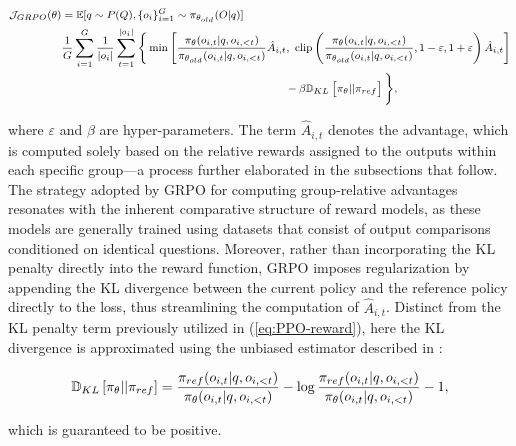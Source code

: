 \begin{itemize}[topsep=0pt]
\begin{itemize}[topsep=0pt]
\begin{equation}
\footnotesize
\begin{split}
    \mathcal{J}_{GRPO}(\theta) &= \mathbb{E}{[q \sim P(Q), \{o_i\}_{i=1}^G \sim \pi_{\theta_{old}}(O|q)]}  \\
    & \frac{1}{G}\sum_{i=1}^G\frac{1}{|o_i|} \sum_{t=1}^{|o_i|} \Bigg\{ \min \left[ \frac{\pi_\theta(o_{i,t} | q, o_{i,<t})}{\pi_{\theta_{old}}(o_{i,t} | q, o_{i,<t})} \hat{A}_{i,t},\ \text{clip} \left( \frac{\pi_\theta(o_{i,t} | q, o_{i,<t})}{\pi_{\theta_{old}}(o_{i,t} | q, o_{i,<t})}, 1 - \varepsilon, 1 + \varepsilon \right)  \hat{A}_{i,t} \right] \\
    & \hspace{6cm} - \beta \mathbb{D}_{KL}\left[\pi_{\theta} || \pi_{ref}\right]\Bigg\} ,
\end{split}
\label{eq:GRPO-obj}
\end{equation}

where $\varepsilon$ and $\beta$ are hyper-parameters. The term $\hat{A}_{i,t}$ denotes the advantage, which is computed solely based on the relative rewards assigned to the outputs within each specific group—a process further elaborated in the subsections that follow. The strategy adopted by GRPO for computing group-relative advantages resonates with the inherent comparative structure of reward models, as these models are generally trained using datasets that consist of output comparisons conditioned on identical questions. Moreover, rather than incorporating the KL penalty directly into the reward function, GRPO imposes regularization by appending the KL divergence between the current policy and the reference policy directly to the loss, thus streamlining the computation of $\hat{A}_{i,t}$. Distinct from the KL penalty term previously utilized in (\ref{eq:PPO-reward}), here the KL divergence is approximated using the unbiased estimator described in \citep{kl_approx}:

\begin{equation}
\small
    \mathbb{D}_{KL}\left[\pi_{\theta} || \pi_{ref}\right] = \frac{\pi_{ref}(o_{i,t}|q,o_{i,<t})}{\pi_{\theta}(o_{i,t}|q,o_{i,<t})}- \log\frac{\pi_{ref}(o_{i,t}|q,o_{i,<t})}{\pi_{\theta}(o_{i,t}|q,o_{i,<t})} - 1,
\end{equation}

which is guaranteed to be positive.


\end{itemize}
\end{itemize}
